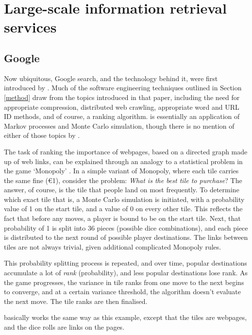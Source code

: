 \section{Large-scale information retrieval services\label{ir}}
\subsection{Google\label{goog}} Now ubiquitous, Google search, and the technology behind it, were first introduced by .  Much of the software
engineering techniques outlined in Section \ref{method} draw
from the topics introduced in that paper, including the need
for appropriate compression, distributed web crawling, appropriate word and
URL ID methods, and of course, a ranking algorithm.  \pr{}
is essentially an application of Markov processes and Monte
Carlo simulation, though there is no mention of
either of those topics by .

The task of ranking the importance of webpages, based on a directed graph
made
up of web links, can be explained through an analogy to a statistical
problem in the
game `Monopoly' \cite{euler84}.  In a simple variant of Monopoly, where each tile carries
the same fine (€1), consider the problem: {\it What is the best tile to
purchase}?  The answer, of course, is the tile that people land on most
frequently. To determine which exact tile that is, a Monte Carlo simulation
is initiated, with a probability value of 1 on the start tile, and a
value of 0 on every other tile.  This reflects the fact that before any
moves, a player is bound to be on the start tile.  Next, that probability of 1 is split into 36 pieces (possible dice combinations), and each piece is distributed to the next round of possible player destinations.
The links between tiles are not always trivial, given additional
complicated Monopoly rules.

This probability splitting process is repeated, and over time,
popular destinations accumulate a lot of {\it rank} (probability),
and less popular destinations lose rank.  As the
game progresses, the variance in tile ranks from one move to the next 
begins to converge, and at a certain variance threshold, the
algorithm doesn't evaluate the next move.  The tile ranks are then
finalised.

\pr{} basically works the same way as this example, except that the
tiles are webpages, and the dice rolls are links on the pages.